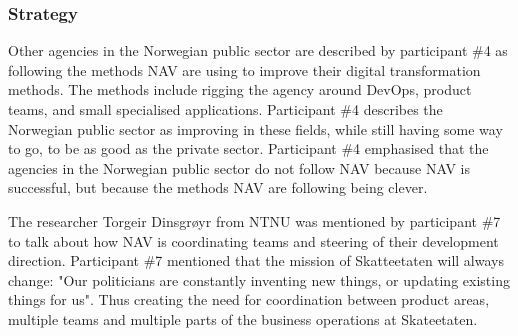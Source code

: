 
\subsubsection{Strategy} \label{sec:strategy}
Other agencies in the Norwegian public sector are described by participant \#4 as following the methods NAV are using to improve their digital transformation methods. The methods include rigging the agency around DevOps, product teams, and small specialised applications. Participant \#4 describes the Norwegian public sector as improving in these fields, while still having some way to go, to be as good as the private sector. Participant \#4 emphasised that the agencies in the Norwegian public sector do not follow NAV because NAV is successful, but because the methods NAV are following being clever.



The researcher Torgeir Dinsgrøyr from NTNU was mentioned by participant \#7 to talk about how NAV is coordinating teams and steering of their development direction. Participant \#7 mentioned that the mission of Skatteetaten will always change: "Our politicians are constantly inventing new things, or updating existing things for us". Thus creating the need for coordination between product areas, multiple teams and multiple parts of the business operations at Skateetaten.

